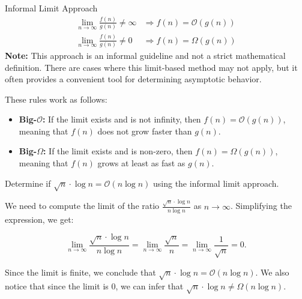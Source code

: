        \begin{custombox}{Informal Limit Approach}
            \[
                \begin{array}{ll}
                \displaystyle \lim_{n \to \infty} \frac{f(n)}{g(n)} \neq \infty & \Rightarrow f(n) = \mathcal{O}(g(n)) \\[10pt]
                \displaystyle \lim_{n \to \infty} \frac{f(n)}{g(n)} \neq 0 & \Rightarrow f(n) = \Omega(g(n))
                \end{array}
                \]
                \medskip
                \textbf{Note:} This approach is an informal guideline and not a strict mathematical definition. There are cases where this limit-based method may not apply, but it often provides a convenient tool for determining asymptotic behavior.
        \end{custombox}
        
        These rules work as follows:
        \begin{itemize}
            \item \textbf{Big-\(\mathcal{O}\):} If the limit exists and is not infinity, then \( f(n) = \mathcal{O}(g(n)) \), meaning that \( f(n) \) does not grow faster than \( g(n) \).
            \item \textbf{Big-\(\Omega\):} If the limit exists and is non-zero, then \( f(n) = \Omega(g(n)) \), meaning that \( f(n) \) grows at least as fast as \( g(n) \).
        \end{itemize}
        
        \begin{example}
            Determine if $\sqrt{n} \cdot \log n=\mathcal{O}(n \log n)$ using the informal limit approach.
        \end{example}

        \begin{solution}
            We need to compute the limit of the ratio \( \frac{\sqrt{n} \cdot \log n}{n \log n} \) as \( n \to \infty \). Simplifying the expression, we get:
            
            \[
            \lim_{n \to \infty} \frac{\sqrt{n} \cdot \log n}{n \log n} = \lim_{n \to \infty} \frac{\sqrt{n}}{n} = \lim_{n \to \infty} \frac{1}{\sqrt{n}} = 0.
            \]
            
            Since the limit is finite, we conclude that \( \sqrt{n} \cdot \log n = \mathcal{O}(n \log n) \). We also notice that since the limit is 0, we can infer that \( \sqrt{n} \cdot \log n \neq \Omega(n \log n) \).
            
        \end{solution}

